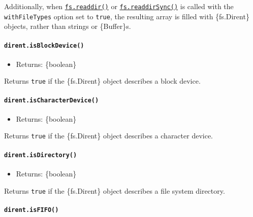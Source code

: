 Additionally, when
\hyperref[fsreaddirpath-options-callback]{\texttt{fs.readdir()}} or
\hyperref[fsreaddirsyncpath-options]{\texttt{fs.readdirSync()}} is
called with the \texttt{withFileTypes} option set to \texttt{true}, the
resulting array is filled with \{fs.Dirent\} objects, rather than
strings or \{Buffer\}s.

\paragraph{\texorpdfstring{\texttt{dirent.isBlockDevice()}}{dirent.isBlockDevice()}}\label{dirent.isblockdevice}

\begin{itemize}
\tightlist
\item
  Returns: \{boolean\}
\end{itemize}

Returns \texttt{true} if the \{fs.Dirent\} object describes a block
device.

\paragraph{\texorpdfstring{\texttt{dirent.isCharacterDevice()}}{dirent.isCharacterDevice()}}\label{dirent.ischaracterdevice}

\begin{itemize}
\tightlist
\item
  Returns: \{boolean\}
\end{itemize}

Returns \texttt{true} if the \{fs.Dirent\} object describes a character
device.

\paragraph{\texorpdfstring{\texttt{dirent.isDirectory()}}{dirent.isDirectory()}}\label{dirent.isdirectory}

\begin{itemize}
\tightlist
\item
  Returns: \{boolean\}
\end{itemize}

Returns \texttt{true} if the \{fs.Dirent\} object describes a file
system directory.

\paragraph{\texorpdfstring{\texttt{dirent.isFIFO()}}{dirent.isFIFO()}}\label{dirent.isfifo}

